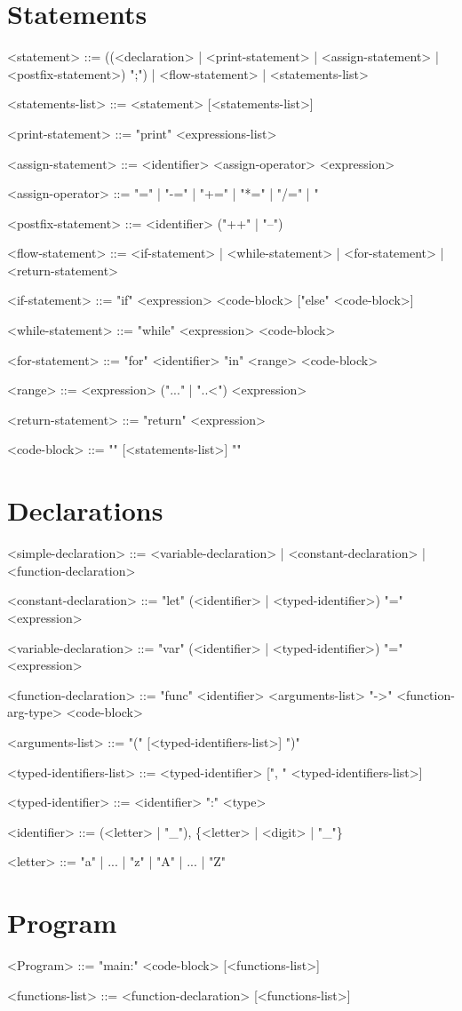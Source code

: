 \documentclass{article}
\begin{document}
\section{Statements}
\begin{grammar}
<statement> ::= ((<declaration> | <print-statement> | <assign-statement> | <postfix-statement>) ";") | <flow-statement> | <statements-list>

<statements-list> ::= <statement> [<statements-list>]

<print-statement> ::= "print" <expressions-list>

<assign-statement> ::= <identifier> <assign-operator> <expression>

<assign-operator> ::= "=" | "-=" | "+=" | "*=" | "/=" | "%

<postfix-statement> ::= <identifier> ("++" | "--")

<flow-statement> ::= <if-statement> | <while-statement> | <for-statement> | <return-statement>

<if-statement> ::= "if" <expression> <code-block> ["else" <code-block>]

<while-statement> ::= "while" <expression> <code-block>

<for-statement> ::= "for" <identifier> "in" <range> <code-block>

<range> ::= <expression> ("..." | "..<") <expression>

<return-statement> ::= "return" <expression>

<code-block> ::= "{" [<statements-list>] "}"
\end{grammar}

\section{Declarations}
\begin{grammar}
<simple-declaration> ::= <variable-declaration> | <constant-declaration> | <function-declaration>

<constant-declaration> ::= "let" (<identifier> | <typed-identifier>) "=" <expression>

<variable-declaration> ::= "var" (<identifier> | <typed-identifier>) "=" <expression>

<function-declaration> ::= "func" <identifier> <arguments-list> "->" <function-arg-type> <code-block>

<arguments-list> ::= "(" [<typed-identifiers-list>] ")"

<typed-identifiers-list> ::= <typed-identifier> [", " <typed-identifiers-list>]

<typed-identifier> ::= <identifier> ":" <type>

<identifier> ::= (<letter> | "_"), \{<letter> | <digit> | "_"\}

<letter> ::= "a" | ... | "z" | "A" | ... | "Z"
\end{grammar}

\section{Program}
\begin{grammar}

<Program> ::= "main:" <code-block> [<functions-list>]

<functions-list> ::= <function-declaration> [<functions-list>]

\end{grammar}
\end{document}
